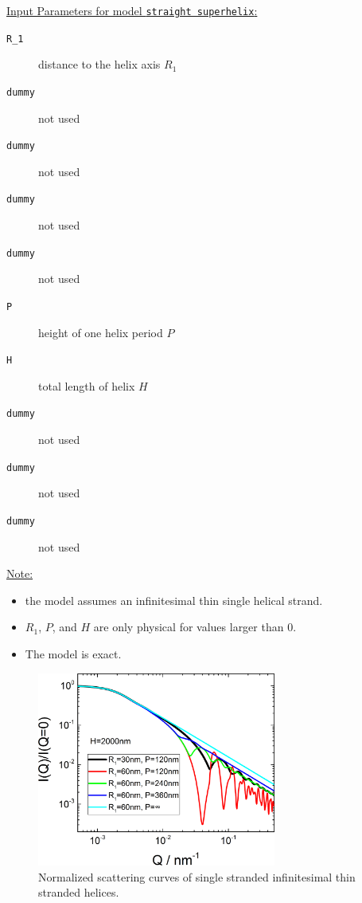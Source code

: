 \vspace{5mm}

\uline{Input Parameters for model \texttt{straight superhelix}:}\\
\begin{description}
\item[\texttt{R\_1}] distance to the helix axis $R_1$
\item[\texttt{dummy}] not used
\item[\texttt{dummy}] not used
\item[\texttt{dummy}] not used
\item[\texttt{dummy}] not used
\item[\texttt{P}] height of one helix period $P$
\item[\texttt{H}] total length of helix $H$
\item[\texttt{dummy}] not used
\item[\texttt{dummy}] not used
\item[\texttt{dummy}] not used
\end{description}

\noindent\uline{Note:}
\begin{itemize}
\item the model assumes an infinitesimal thin single helical strand.
\item $R_1$, $P$, and $H$ are only physical for values larger than 0.
\item The model is exact.
\end{itemize}

\begin{figure}[htb]
\begin{center}
\includegraphics[width=0.7\textwidth]{../images/form_factor/cylindrical_obj/helix_straightIQ.png}
\end{center}
\caption{Normalized scattering curves of single stranded infinitesimal thin stranded helices.}
\label{fig:helixstraightIQ}
\end{figure}

